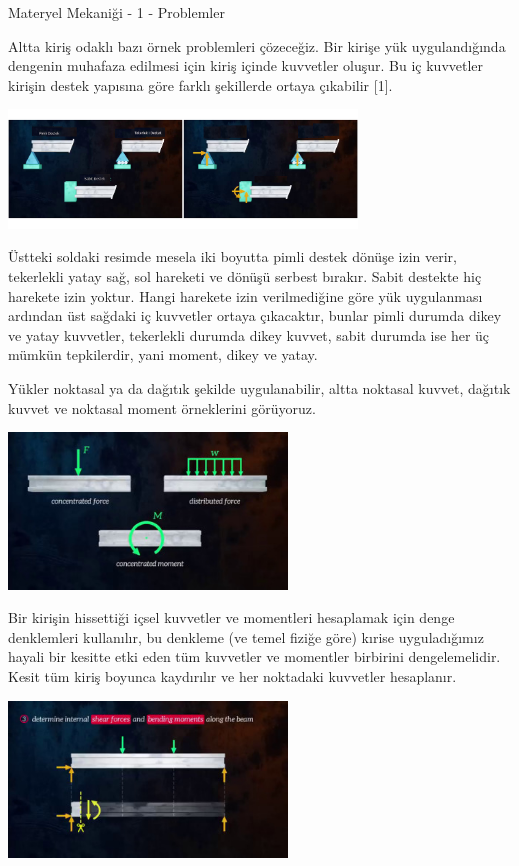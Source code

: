 \documentclass[12pt,fleqn]{article}\usepackage{../../common}
\begin{document}
Materyel Mekaniği - 1 - Problemler

Altta kiriş odaklı bazı örnek problemleri çözeceğiz. Bir kirişe yük
uygulandığında dengenin muhafaza edilmesi için kiriş içinde kuvvetler oluşur.
Bu iç kuvvetler kirişin destek yapısına göre farklı şekillerde ortaya çıkabilir
[1].

\includegraphics[width=25em]{phy_020_strs_01b_01.jpg}

Üstteki soldaki resimde mesela iki boyutta pimli destek dönüşe izin verir,
tekerlekli yatay sağ, sol hareketi ve dönüşü serbest bırakır. Sabit destekte hiç
harekete izin yoktur. Hangi harekete izin verilmediğine göre yük uygulanması
ardından üst sağdaki iç kuvvetler ortaya çıkacaktır, bunlar pimli durumda dikey
ve yatay kuvvetler, tekerlekli durumda dikey kuvvet, sabit durumda ise her üç
mümkün tepkilerdir, yani moment, dikey ve yatay.

Yükler noktasal ya da dağıtık şekilde uygulanabilir, altta noktasal kuvvet,
dağıtık kuvvet ve noktasal moment örneklerini görüyoruz.

\includegraphics[width=20em]{phy_020_strs_01b_02.jpg}

Bir kirişin hissettiği içsel kuvvetler ve momentleri hesaplamak için denge
denklemleri kullanılır, bu denkleme (ve temel fiziğe göre) kırise uyguladığımız
hayali bir kesitte etki eden tüm kuvvetler ve momentler birbirini
dengelemelidir. Kesit tüm kiriş boyunca kaydırılır ve her noktadaki kuvvetler
hesaplanır.

\includegraphics[width=20em]{phy_020_strs_01b_03.jpg}
\end{document}

